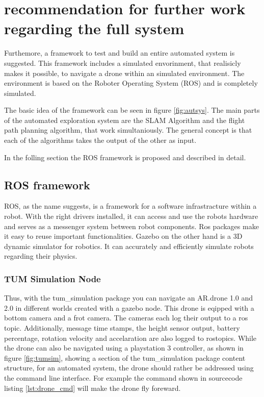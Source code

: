 \chapter{recommendation for further work regarding the full system}

	Furthemore, a framework to test and build an entire automated system is suggested. This framework includes a 
	simulated envorinment, that realisicly makes it possible, to navigate a drone within an simulated environment. The environment 
	is based on the Roboter Operating System (ROS) and is completely simulated. 
	
	The basic idea of the framework can be seen in figure \ref{fig:autsys}. The main parts of the automated exploration system are the SLAM Algorithm
	and the flight path planning algorithm, that work simultaniously. The general concept is that each of the algorithms takes the output of the other as 
	input. 
	
	In the folling section the ROS framework is proposed and described in detail. 
	


\section{ROS framework}

		
	ROS, as the name suggests, is a framework for a software infrastracture within a robot. With the right drivers installed, 
	it can access and use the robots hardware and serves as a messenger system between robot components. Ros packages make it easy to 
	reuse important functionalities. Gazebo on the other hand is a 3D dynamic simulator for robotics. It can accurately and efficiently simulate robots regarding
	their physics. 
	
	
	
	\subsection{TUM Simulation Node}
	
	Thus, with the tum\_simulation package you can navigate an AR.drone 1.0 and 2.0 in different worlds created with a gazebo node. This drone is eqipped with a bottom camera 
	and a frot camera. The cameras each log their output to a ros topic. Additionally, message time stamps, the height sensor output, 
	battery percentage, rotation
	velocity and accelaration are also logged to rostopics. While the drone can also be navigated using a playstation 3 controller, as shown in figure 
	\ref{fig:tumsim}, showing a section of the tum\_simulation package content structure, 
	for an automated system, the drone should rather be addressed using the command line interface. For example 
	the command shown in sourcecode listing \ref{lst:drone_cmd} will make the drone fly foreward. 
	
